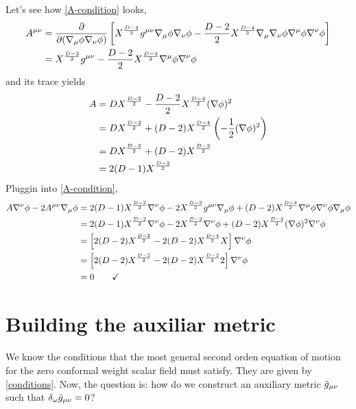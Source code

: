 \begin{ej}
Let's see how \eqref{A-condition} looks,
\begin{align}
  A^{\mu\nu }&=\pdv{(\nabla_\mu\phi\nabla_\nu\phi)}\left[X^{\frac{D-2}{2}}g^{\mu\nu }\nabla_\mu\phi \nabla_\nu\phi  -\frac{D-2}{2}X^{\frac{D-4}{2}}\nabla_\mu \nabla_\nu \phi\nabla^\mu \phi\nabla^\nu \phi \right]\\
  &=X^{\frac{D-2}{2}}g^{\mu\nu }-\frac{D-2}{2}X^{\frac{D-4}{2}}\nabla^\mu \phi \nabla^\nu\phi 
\end{align}
and its trace yields
\begin{align}
  A&=DX^{\frac{D-2}{2}}-\frac{D-2}{2}X^{\frac{D-4}{2}}(\nabla\phi )^2\\
  &=DX^{\frac{D-2}{2}}+(D-2)X^{\frac{D-4}{2}}\left(-\frac{1}{2}(\nabla\phi )^2\right)\\
  &=DX^{\frac{D-2}{2}}+(D-2)X^{\frac{D-2}{2}}\\
  &=2(D-1)X^{\frac{D-2}{2}}
\end{align}
Pluggin into \eqref{A-condition},
\begin{align*}
  A\nabla^\nu \phi-2A^{\mu\nu }\nabla_\mu \phi&=2(D-1)X^{\frac{D-2}{2}}\nabla^\nu\phi -2X^{\frac{D-2}{2}}g^{\mu\nu }\nabla_\mu \phi +(D-2)X^{\frac{D-4}{2}}\nabla^\mu\phi \nabla^\nu\phi \nabla_\mu\phi \\
  &=2(D-1)X^{\frac{D-2}{2}}\nabla^\nu\phi-2X^{\frac{D-2}{2}}\nabla^\nu\phi +(D-2)X^{\frac{D-4}{2}}(\nabla\phi )^2\nabla^\nu\phi \\
  &=\left[2(D-2)X^{\frac{D-2}{2}}-2(D-2)X^{\frac{D-4}{2}}X\right]\nabla^\nu\phi \\
  &=\left[2(D-2)X^{\frac{D-2}{2}}-2(D-2)X^{\frac{D-2}{2}}2\right]\nabla^\nu\phi \\
  &=0\qquad \checkmark
\end{align*}
\end{ej}



\section{Building the auxiliar metric}
We know the conditions that the most general second orden equation of motion for the zero conformal weight scalar field must satisfy. They are given by \eqref{conditions}. Now, the question is: how do we construct an auxiliary metric $\tilde{g}_{\mu\nu }$ such that  $\delta_\omega \tilde{g}_{\mu\nu }=0$?

